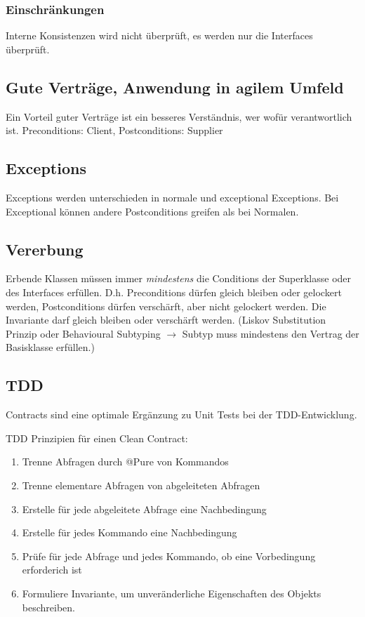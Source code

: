 \subsubsection{Einschränkungen}

Interne Konsistenzen wird nicht überprüft, es werden nur die Interfaces überprüft. 

\subsection{Gute Verträge, Anwendung in agilem Umfeld}

Ein Vorteil guter Verträge ist ein besseres Verständnis, wer wofür verantwortlich ist.
Preconditions: Client, Postconditions: Supplier


\subsection{Exceptions}

Exceptions werden unterschieden in normale  und exceptional Exceptions. Bei Exceptional können andere Postconditions greifen als bei Normalen.

\subsection{Vererbung}

Erbende Klassen müssen immer \emph{mindestens} die Conditions der Superklasse oder des Interfaces erfüllen. D.h. Preconditions dürfen gleich bleiben oder gelockert werden, Postconditions dürfen verschärft, aber nicht gelockert werden. Die Invariante darf gleich bleiben oder verschärft werden. (Liskov Substitution Prinzip oder Behavioural Subtyping $\rightarrow$ Subtyp muss mindestens den Vertrag der Basisklasse erfüllen.)

\subsection{TDD}

Contracts sind eine optimale Ergänzung zu Unit Tests bei der TDD-Entwicklung.

TDD Prinzipien für einen Clean Contract:
\begin{enumerate}
	\item Trenne Abfragen durch @Pure von Kommandos
	\item Trenne elementare Abfragen von abgeleiteten Abfragen
	\item Erstelle für jede abgeleitete Abfrage eine Nachbedingung
	\item Erstelle für jedes Kommando eine Nachbedingung
	\item Prüfe für jede Abfrage und jedes Kommando, ob eine Vorbedingung erforderich ist
	\item Formuliere Invariante, um unveränderliche Eigenschaften des Objekts beschreiben.
\end{enumerate}

